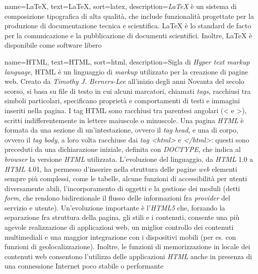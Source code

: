  {
    name=LaTeX,
    text=LaTeX,
    sort=latex,
    description={\emph{LaTeX} è un sistema di composizione tipografica di alta qualità, che include funzionalità progettate per la produzione di documentazione tecnica e scientifica. LaTeX è lo standard de facto per la comunicazione e la pubblicazione di documenti scientifici. Inoltre, LaTeX è disponibile come software libero}
}

 {
    name=HTML,
    text=HTML,
    sort=html,
    description={Sigla di \emph{Hyper text markup language}, HTML è un linguaggio di \emph{markup} utilizzato per la creazione di pagine web.
    Creato da \emph{Timothy J. Berners-Lee} all’inizio degli anni Novanta del secolo scorso, si basa su file di testo in cui alcuni marcatori, chiamati \emph{tags}, racchiusi tra simboli particolari, specificano proprietà e comportamenti di testi e immagini inseriti nella pagina.
    I tag HTML sono racchiusi tra parentesi angolari (< e >), scritti indifferentemente in lettere maiuscole o minuscole. 
    Una pagina \emph{HTML} è formata da una sezione di un’intestazione, ovvero il \emph{tag head}, e una di corpo, ovvero il \emph{tag body}, a loro volta racchiuse dai \emph{tag <html>} e \emph{</html>}: questi sono preceduti da una dichiarazione iniziale, definita con \emph{DOCTYPE}, che indica al \emph{browser} la versione \emph{HTML} utilizzata. L’evoluzione del linguaggio, da \emph{HTML} 1.0 a \emph{HTML} 4.01, ha permesso d'inserire nella struttura delle pagine \emph{web} elementi sempre più complessi, come le tabelle, alcune funzioni di accessibilità per utenti diversamente abili, l’incorporamento di oggetti e la gestione dei moduli (detti \emph{form}, che rendono bidirezionale il flusso delle informazioni fra \emph{provider} del servizio e utente). 
    Un’evoluzione importante è l’\emph{HTML5} che, forzando la separazione fra struttura della pagina, gli stili e i contenuti, consente una più agevole realizzazione di applicazioni web, un miglior controllo dei contenuti multimediali e una maggior integrazione con i dispositivi mobili (per es. con funzioni di geolocalizzazione). 
    Inoltre, le funzioni di memorizzazione in locale dei contenuti web consentono l’utilizzo delle applicazioni \emph{HTML} anche in presenza di una connessione Internet poco stabile o performante}
}

